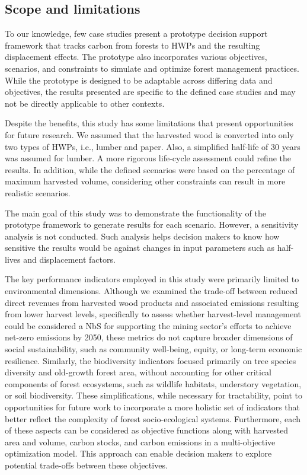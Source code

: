 \documentclass[preprint,12pt]{elsarticle}
\begin{document}
\subsection{Scope and limitations}
\label{sec: limitations}
To our knowledge, few case studies present a prototype decision support framework that tracks carbon from forests to HWPs and the resulting displacement effects. The prototype also incorporates various objectives, scenarios, and constraints to simulate and optimize forest management practices. While the prototype is designed to be adaptable across differing data and objectives, the results presented are specific to the defined case studies and may not be directly applicable to other contexts.

Despite the benefits, this study has some limitations that present opportunities for future research. We assumed that the harvested wood is converted into only two types of HWPs, i.e., lumber and paper. Also, a simplified half-life of 30 years was assumed for lumber. A more rigorous life-cycle assessment could refine the results. In addition, while the defined scenarios were based on the percentage of maximum harvested volume, considering other constraints can result in more realistic scenarios.

The main goal of this study was to demonstrate the functionality of the prototype framework to generate results for each scenario. However, a sensitivity analysis is not conducted. Such analysis helps decision makers to know how sensitive the results would be against changes in input parameters such as half-lives and displacement factors. 

The key performance indicators employed in this study were primarily limited to environmental dimensions. Although we examined the trade-off between reduced direct revenues from harvested wood products and associated emissions resulting from lower harvest levels,  specifically to assess whether harvest-level management could be considered a NbS for supporting the mining sector’s efforts to achieve net-zero emissions by 2050, these metrics do not capture broader dimensions of social sustainability, such as community well-being, equity, or long-term economic resilience. Similarly, the biodiversity indicators focused primarily on tree species diversity and old-growth forest area, without accounting for other critical components of forest ecosystems, such as wildlife habitats, understory vegetation, or soil biodiversity. These simplifications, while necessary for tractability, point to opportunities for future work to incorporate a more holistic set of indicators that better reflect the complexity of forest socio-ecological systems. Furthermore, each of these aspects can be considered as objective functions along with harvested area and volume, carbon stocks, and carbon emissions in a multi-objective optimization model. This approach can enable decision makers to explore potential trade-offs between these objectives. 
\end{document}
